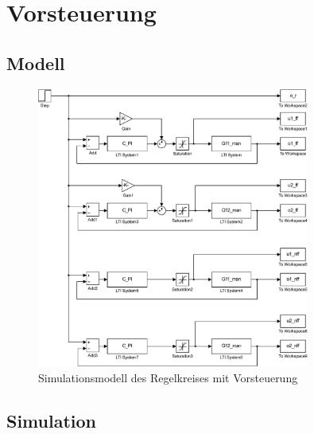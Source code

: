 \section{Vorsteuerung}

\subsection{Modell}

\begin{figure}[h!]
	\centering
	\includegraphics[width=0.8\textwidth]{13/model.pdf}
	\caption{Simulationsmodell des Regelkreises mit Vorsteuerung}
\end{figure}

\subsection{Simulation}



